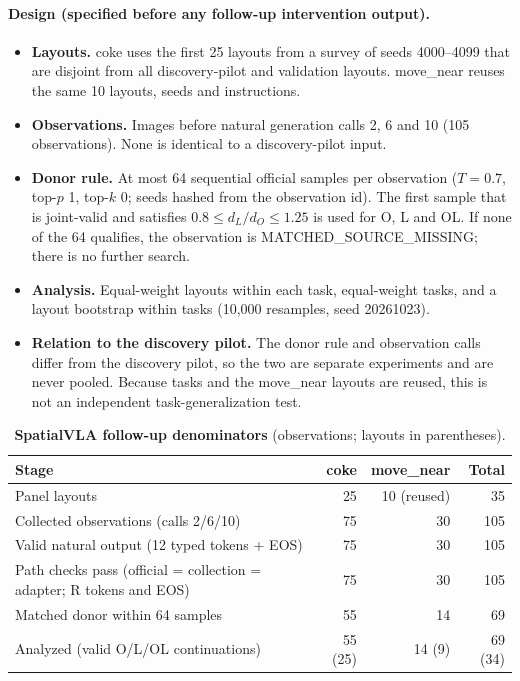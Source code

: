 \paragraph{Design (specified before any follow-up intervention output).}
\begin{itemize}
\item \textbf{Layouts.} coke uses the first 25 layouts from a survey of seeds 4000--4099 that are disjoint from all discovery-pilot and validation layouts. move\_near reuses the same 10 layouts, seeds and instructions.
\item \textbf{Observations.} Images before natural generation calls 2, 6 and 10 (105 observations). None is identical to a discovery-pilot input.
\item \textbf{Donor rule.} At most 64 sequential official samples per observation ($T{=}0.7$, top-$p$ 1, top-$k$ 0; seeds hashed from the observation id). The first sample that is joint-valid and satisfies $0.8\le d_L/d_O\le1.25$ is used for O, L and OL. If none of the 64 qualifies, the observation is MATCHED\_SOURCE\_MISSING; there is no further search.
\item \textbf{Analysis.} Equal-weight layouts within each task, equal-weight tasks, and a layout bootstrap within tasks (10,000 resamples, seed 20261023).
\item \textbf{Relation to the discovery pilot.} The donor rule and observation calls differ from the discovery pilot, so the two are separate experiments and are never pooled. Because tasks and the move\_near layouts are reused, this is not an independent task-generalization test.
\end{itemize}

\begin{table}[h]
\centering\small
\caption{\textbf{SpatialVLA follow-up denominators} (observations; layouts in parentheses).}
\label{tab:svla2flow}
\begin{tabular}{@{}lrrr@{}}\toprule
Stage & coke & move\_near & Total\\\midrule
Panel layouts & 25 & 10 (reused) & 35\\
Collected observations (calls 2/6/10) & 75 & 30 & 105\\
Valid natural output (12 typed tokens + EOS) & 75 & 30 & 105\\
Path checks pass (official = collection = adapter; R tokens and EOS) & 75 & 30 & 105\\
Matched donor within 64 samples & 55 & 14 & 69\\
Analyzed (valid O/L/OL continuations) & 55 (25) & 14 (9) & 69 (34)\\\bottomrule
\end{tabular}
\end{table}

